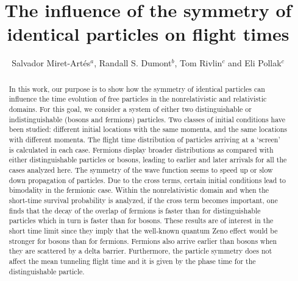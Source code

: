\documentclass[preprint,aps]{revtex4}
\begin{document}
	
\title{The influence of the symmetry of identical particles on flight times}
\author{Salvador Miret-Art\'es$^a$, Randall S. Dumont$^b$, Tom Rivlin$^c$ and Eli Pollak$^c$}






\begin{abstract}
	
In this work, our purpose is to show how the symmetry of identical particles can influence  the time evolution of  free particles in the nonrelativistic and relativistic domains. For this goal, we consider a system of either two distinguishable or indistinguishable (bosons and fermions) particles. Two classes of initial conditions have been studied: different initial locations with the same momenta, and the same locations with different momenta. The flight time distribution of particles arriving at a `screen' is calculated in each case. Fermions display broader distributions as compared with either distinguishable particles or bosons, leading to earlier and later arrivals for all the cases analyzed here. The symmetry of the wave function seems to speed up or slow down propagation of particles. Due to the cross terms, certain initial conditions lead to bimodality in the fermionic case. 
Within the nonrelativistic domain and when the short-time survival probability is analyzed,  
if the cross term becomes important, one finds that the decay of the overlap of fermions 
is faster than for distinguishable particles which in turn is faster than for bosons. These results are of interest in the short time limit since they imply that the well-known quantum Zeno effect would be stronger for bosons than for fermions. 
Fermions also arrive earlier than bosons when they are scattered by a delta barrier. Furthermore, the particle symmetry does not affect the mean tunneling flight time and it is given by the phase time for the distinguishable particle.
	
\end{abstract}	


\maketitle
\end{document}
